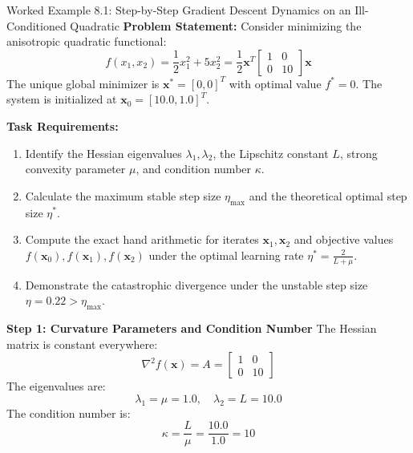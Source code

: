 \begin{examplebox}[breakable]{Worked Example 8.1: Step-by-Step Gradient Descent Dynamics on an Ill-Conditioned Quadratic}
\textbf{Problem Statement:}
Consider minimizing the anisotropic quadratic functional:
\begin{equation}
f(x_1, x_2) = \frac{1}{2} x_1^2 + 5 x_2^2 = \frac{1}{2} \mathbf{x}^T \begin{bmatrix} 1 & 0 \\ 0 & 10 \end{bmatrix} \mathbf{x}
\end{equation}
The unique global minimizer is $\mathbf{x}^* = [0, 0]^T$ with optimal value $f^* = 0$.
The system is initialized at $\mathbf{x}_0 = [10.0, 1.0]^T$.

\textbf{Task Requirements:}
\begin{enumerate}
    \item Identify the Hessian eigenvalues $\lambda_1, \lambda_2$, the Lipschitz constant $L$, strong convexity parameter $\mu$, and condition number $\kappa$.
    \item Calculate the maximum stable step size $\eta_{\max}$ and the theoretical optimal step size $\eta^*$.
    \item Compute the exact hand arithmetic for iterates $\mathbf{x}_1, \mathbf{x}_2$ and objective values $f(\mathbf{x}_0), f(\mathbf{x}_1), f(\mathbf{x}_2)$ under the optimal learning rate $\eta^* = \frac{2}{L+\mu}$.
    \item Demonstrate the catastrophic divergence under the unstable step size $\eta = 0.22 > \eta_{\max}$.
\end{enumerate}

\tcblower

\textbf{Step 1: Curvature Parameters and Condition Number}
The Hessian matrix is constant everywhere:
\begin{equation}
\nabla^2 f(\mathbf{x}) = A = \begin{bmatrix} 1 & 0 \\ 0 & 10 \end{bmatrix}
\end{equation}
The eigenvalues are:
\begin{equation}
\lambda_1 = \mu = 1.0, \quad \lambda_2 = L = 10.0
\end{equation}
The condition number is:
\begin{equation}
\kappa = \frac{L}{\mu} = \frac{10.0}{1.0} = 10
\end{equation}


\end{examplebox}
